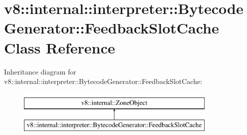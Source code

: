 \hypertarget{classv8_1_1internal_1_1interpreter_1_1BytecodeGenerator_1_1FeedbackSlotCache}{}\section{v8\+:\+:internal\+:\+:interpreter\+:\+:Bytecode\+Generator\+:\+:Feedback\+Slot\+Cache Class Reference}
\label{classv8_1_1internal_1_1interpreter_1_1BytecodeGenerator_1_1FeedbackSlotCache}
Inheritance diagram for v8\+:\+:internal\+:\+:interpreter\+:\+:Bytecode\+Generator\+:\+:Feedback\+Slot\+Cache\+:\begin{figure}[H]
\begin{center}
\leavevmode
\includegraphics[height=2.000000cm]{classv8_1_1internal_1_1interpreter_1_1BytecodeGenerator_1_1FeedbackSlotCache}
\end{center}
\end{figure}
